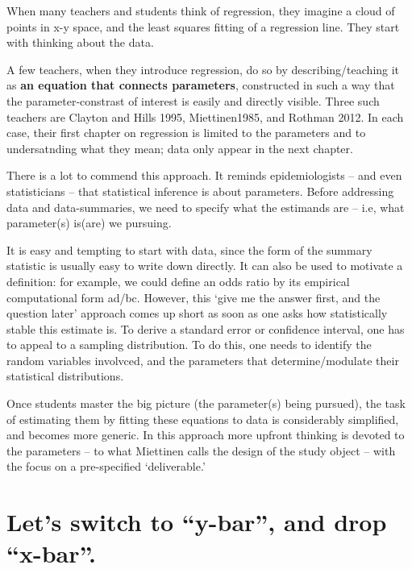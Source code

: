 \documentclass[]{book}
\begin{document}
When many teachers and students think of regression, they imagine a cloud of points in x-y space, and the least squares fitting of a regression line. They start with thinking about the data.

A few teachers, when they introduce regression, do so by describing/teaching it as \textbf{an equation that connects parameters}, constructed in such a way that the parameter-constrast of interest is easily and directly visible. Three such teachers are Clayton and Hills 1995, Miettinen1985, and Rothman 2012. In each case, their first chapter on regression is limited to the parameters and to undersatnding what they mean; data only appear in the next chapter.

There is a lot to commend this approach. It reminds epidemiologists -- and even statisticians -- that statistical inference is about parameters. Before addressing data and data-summaries, we need to specify what the estimands are -- i.e, what parameter(s) is(are) we pursuing.

It is easy and tempting to start with data, since the form of the summary statistic is usually easy to write down directly. It can also be used to motivate a definition: for example, we could define an odds ratio by its empirical computational form ad/bc. However, this `give me the answer first, and the question later' approach comes up short as soon as one asks how statistically stable this estimate is. To derive a standard error or confidence interval, one has to appeal to a sampling distribution. To do this, one needs to identify the random variables involvced, and the parameters that determine/modulate their statistical distributions.

Once students master the big picture (the parameter(s) being pursued), the task of estimating them by fitting these equations to data is considerably simplified, and becomes more generic. In this approach more upfront thinking is devoted to the parameters -- to what Miettinen calls the design of the study object -- with the focus on a pre-specified `deliverable.'

\hypertarget{lets-switch-to-y-bar-and-drop-x-bar.}{%
\section{Let's switch to ``y-bar'', and drop ``x-bar''.}\label{lets-switch-to-y-bar-and-drop-x-bar.}}
\end{document}
